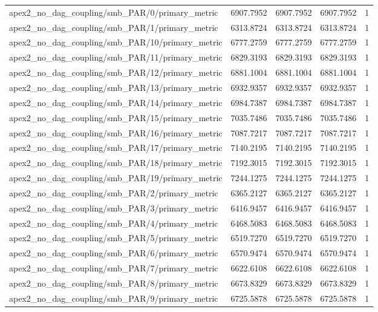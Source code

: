 \begin{table}[h]
\begin{tabular}{lrrrr}
apex2_no_dag_coupling/smb_PAR/0/primary_metric & 6907.7952 & 6907.7952 & 6907.7952 & 1 \\
apex2_no_dag_coupling/smb_PAR/1/primary_metric & 6313.8724 & 6313.8724 & 6313.8724 & 1 \\
apex2_no_dag_coupling/smb_PAR/10/primary_metric & 6777.2759 & 6777.2759 & 6777.2759 & 1 \\
apex2_no_dag_coupling/smb_PAR/11/primary_metric & 6829.3193 & 6829.3193 & 6829.3193 & 1 \\
apex2_no_dag_coupling/smb_PAR/12/primary_metric & 6881.1004 & 6881.1004 & 6881.1004 & 1 \\
apex2_no_dag_coupling/smb_PAR/13/primary_metric & 6932.9357 & 6932.9357 & 6932.9357 & 1 \\
apex2_no_dag_coupling/smb_PAR/14/primary_metric & 6984.7387 & 6984.7387 & 6984.7387 & 1 \\
apex2_no_dag_coupling/smb_PAR/15/primary_metric & 7035.7486 & 7035.7486 & 7035.7486 & 1 \\
apex2_no_dag_coupling/smb_PAR/16/primary_metric & 7087.7217 & 7087.7217 & 7087.7217 & 1 \\
apex2_no_dag_coupling/smb_PAR/17/primary_metric & 7140.2195 & 7140.2195 & 7140.2195 & 1 \\
apex2_no_dag_coupling/smb_PAR/18/primary_metric & 7192.3015 & 7192.3015 & 7192.3015 & 1 \\
apex2_no_dag_coupling/smb_PAR/19/primary_metric & 7244.1275 & 7244.1275 & 7244.1275 & 1 \\
apex2_no_dag_coupling/smb_PAR/2/primary_metric & 6365.2127 & 6365.2127 & 6365.2127 & 1 \\
apex2_no_dag_coupling/smb_PAR/3/primary_metric & 6416.9457 & 6416.9457 & 6416.9457 & 1 \\
apex2_no_dag_coupling/smb_PAR/4/primary_metric & 6468.5083 & 6468.5083 & 6468.5083 & 1 \\
apex2_no_dag_coupling/smb_PAR/5/primary_metric & 6519.7270 & 6519.7270 & 6519.7270 & 1 \\
apex2_no_dag_coupling/smb_PAR/6/primary_metric & 6570.9474 & 6570.9474 & 6570.9474 & 1 \\
apex2_no_dag_coupling/smb_PAR/7/primary_metric & 6622.6108 & 6622.6108 & 6622.6108 & 1 \\
apex2_no_dag_coupling/smb_PAR/8/primary_metric & 6673.8329 & 6673.8329 & 6673.8329 & 1 \\
apex2_no_dag_coupling/smb_PAR/9/primary_metric & 6725.5878 & 6725.5878 & 6725.5878 & 1 \\

\end{tabular}
\end{table}
